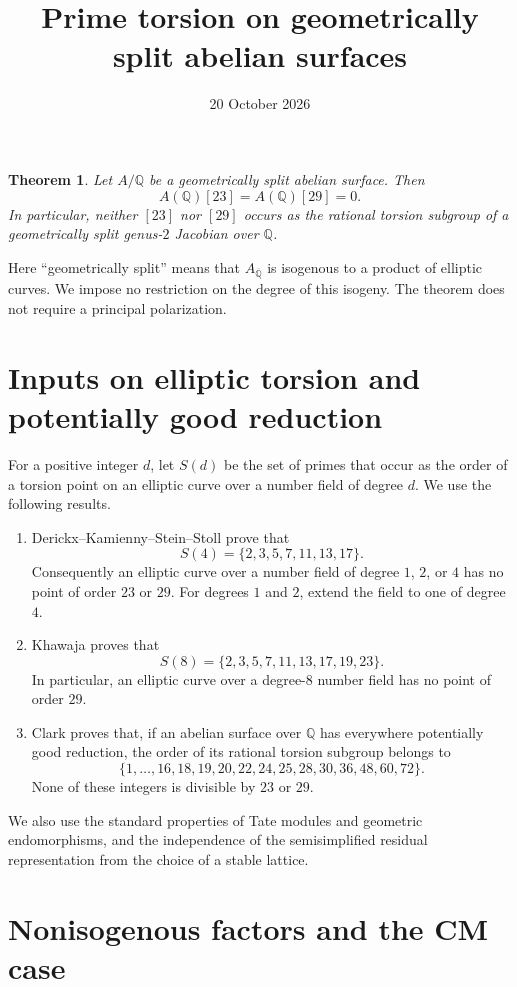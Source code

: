 \documentclass[11pt]{article}
\title{Prime torsion on geometrically split abelian surfaces}
\author{}
\date{20 October 2026}
\newtheorem{theorem}{Theorem}
\newcommand{\Q}{\mathbb Q}
\begin{document}
\maketitle

\begin{theorem}\label{thm:main}
Let \(A/\Q\) be a geometrically split abelian surface. Then
\[
 A(\Q)[23]=A(\Q)[29]=0.
\]
In particular, neither \([23]\) nor \([29]\) occurs as the rational
torsion subgroup of a geometrically split genus-\(2\) Jacobian over
\(\Q\).
\end{theorem}

Here ``geometrically split'' means that \(A_{\overline{\Q}}\) is
isogenous to a product of elliptic curves. We impose no restriction on
the degree of this isogeny. The theorem does not require a principal
polarization.

\section{Inputs on elliptic torsion and potentially good reduction}

For a positive integer \(d\), let \(S(d)\) be the set of primes that
occur as the order of a torsion point on an elliptic curve over a number
field of degree \(d\). We use the following results.
\begin{enumerate}
\item Derickx--Kamienny--Stein--Stoll \cite[Theorem 1.2]{DKSS} prove
that
\[
 S(4)=\{2,3,5,7,11,13,17\}.
\]
Consequently an elliptic curve over a number field of degree \(1\),
\(2\), or \(4\) has no point of order \(23\) or \(29\). For degrees
\(1\) and \(2\), extend the field to one of degree \(4\).
\item Khawaja \cite[Theorem 1.2]{Khawaja} proves that
\[
 S(8)=\{2,3,5,7,11,13,17,19,23\}.
\]
In particular, an elliptic curve over a degree-\(8\) number field has
no point of order \(29\).
\item Clark \cite[Theorem 5]{Clark} proves that, if an abelian surface
over \(\Q\) has everywhere potentially good reduction, the order of
its rational torsion subgroup belongs to
\[
 \{1,\ldots,16,18,19,20,22,24,25,28,30,36,48,60,72\}.
\]
None of these integers is divisible by \(23\) or \(29\).
\end{enumerate}
We also use the standard properties of Tate modules and geometric
endomorphisms, and the independence of the semisimplified residual
representation from the choice of a stable lattice.

\section{Nonisogenous factors and the CM case}
\end{document}
